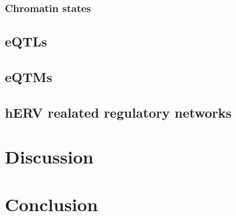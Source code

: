 \documentclass[a4paper,12pt]{article}
\begin{document}
\subsubsection{Chromatin states}

\subsection{eQTLs}

\subsection{eQTMs}

\subsection{hERV realated regulatory networks}


\section{Discussion}


\section{Conclusion}
\end{document}
